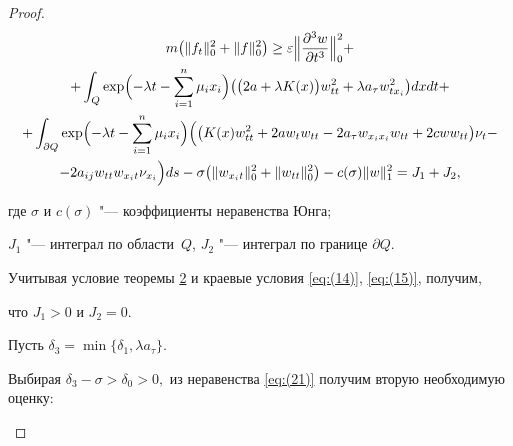 \begin{proof}
\begin{multline}
\label{eq:(21)}

m \bigl( \| {{f}_{t}} \|_{0}^{2}+ \| f \|_{0}^{2} \bigr) \ge 

\varepsilon \Bigl\| \frac{\partial ^3 w}{\partial t^3} \Bigr\|_{0}^{2} +

\\

+\int_{Q}

\exp 

\Bigl(-\lambda t -\sum\limits_{i=1}^{n}{{{\mu }_{i}}{{x}_{i}}} \Bigr) 

\bigl( \bigl( 2a+ \lambda K(x) \bigr) w_{tt}^{2} +\lambda {a}_{\tau } w_{t x_i}^{2}\bigr)dxdt + 

\\

+\int_{\partial Q}

\exp 

\Bigl(-\lambda t -\sum\limits_{i=1}^{n}{{{\mu }_{i}}{{x}_{i}}} \Bigr) 

\Bigl(

\bigl( K(x) w_{tt}^{2}+2a {w}_{t} {w}_{tt} -2{a}_{\tau } {w}_{x_i x_i} 

{w}_{tt}+2cw {w}_{tt} \bigr){\nu }_{t}-

\\

-

2{a}_{ij} {w}_{tt} {w}_{x_i t} {\nu }_{x_i}

\Bigr)ds 

-\sigma \bigl(\| {{w}_{{{x}_{i}}t}} \|_{0}^{2}+ \| {{w}_{tt}} \|_{0}^{2}\bigr)-

c(\sigma ) \| w \|_{1}^{2}=J_1+J_2, 

\end{multline}

где $\sigma $ и $c(\sigma) $ "--- коэффициенты неравенства Юнга;  

${{J}_{1}}$ "--- интеграл по области~$Q$, ${{J}_{2}}$ "--- интеграл по границе $\partial Q$.

Учитывая условие теоремы \hyperlink{dzh:th2}{2} и краевые   условия  \eqref{eq:(14)}, \eqref{eq:(15)}, получим,  

что ${J}_{1}>0$ и   ${{J}_{2}}=0.$ 

Пусть $\delta _{3} =\min \{ \delta _1,\lambda a_ \tau  \}.$ 

Выбирая $\delta _3-\sigma >\delta _{0}>0,$ из неравенства \eqref{eq:(21)}  получим вторую  необходимую оценку:

\begin{equation}


\end{equation}
\end{proof}
